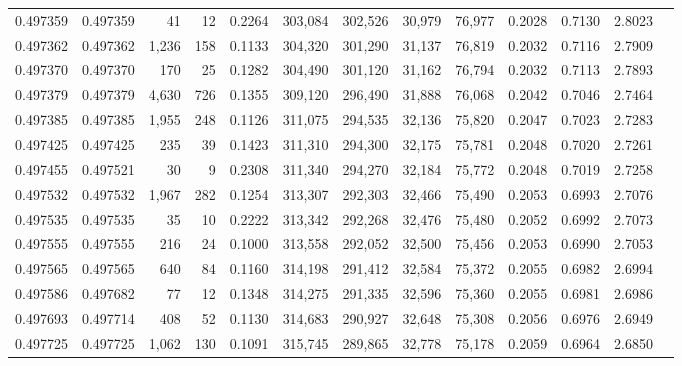 \begin{tabular}{rrrrrrrrrrrrr}
0.497359 & 0.497359 &    41 &    12 &                                     0.2264 & 303,084 & 302,526 &  30,979 &  76,977 & 0.2028 & 0.7130 & 2.8023 \\
0.497362 & 0.497362 & 1,236 &   158 &                                     0.1133 & 304,320 & 301,290 &  31,137 &  76,819 & 0.2032 & 0.7116 & 2.7909 \\
0.497370 & 0.497370 &   170 &    25 &                                     0.1282 & 304,490 & 301,120 &  31,162 &  76,794 & 0.2032 & 0.7113 & 2.7893 \\
0.497379 & 0.497379 & 4,630 &   726 &                                     0.1355 & 309,120 & 296,490 &  31,888 &  76,068 & 0.2042 & 0.7046 & 2.7464 \\
0.497385 & 0.497385 & 1,955 &   248 &                                     0.1126 & 311,075 & 294,535 &  32,136 &  75,820 & 0.2047 & 0.7023 & 2.7283 \\
0.497425 & 0.497425 &   235 &    39 &                                     0.1423 & 311,310 & 294,300 &  32,175 &  75,781 & 0.2048 & 0.7020 & 2.7261 \\
0.497455 & 0.497521 &    30 &     9 &                                     0.2308 & 311,340 & 294,270 &  32,184 &  75,772 & 0.2048 & 0.7019 & 2.7258 \\
0.497532 & 0.497532 & 1,967 &   282 &                                     0.1254 & 313,307 & 292,303 &  32,466 &  75,490 & 0.2053 & 0.6993 & 2.7076 \\
0.497535 & 0.497535 &    35 &    10 &                                     0.2222 & 313,342 & 292,268 &  32,476 &  75,480 & 0.2052 & 0.6992 & 2.7073 \\
0.497555 & 0.497555 &   216 &    24 &                                     0.1000 & 313,558 & 292,052 &  32,500 &  75,456 & 0.2053 & 0.6990 & 2.7053 \\
0.497565 & 0.497565 &   640 &    84 &                                     0.1160 & 314,198 & 291,412 &  32,584 &  75,372 & 0.2055 & 0.6982 & 2.6994 \\
0.497586 & 0.497682 &    77 &    12 &                                     0.1348 & 314,275 & 291,335 &  32,596 &  75,360 & 0.2055 & 0.6981 & 2.6986 \\
0.497693 & 0.497714 &   408 &    52 &                                     0.1130 & 314,683 & 290,927 &  32,648 &  75,308 & 0.2056 & 0.6976 & 2.6949 \\
0.497725 & 0.497725 & 1,062 &   130 &                                     0.1091 & 315,745 & 289,865 &  32,778 &  75,178 & 0.2059 & 0.6964 & 2.6850 \\

\end{tabular}

